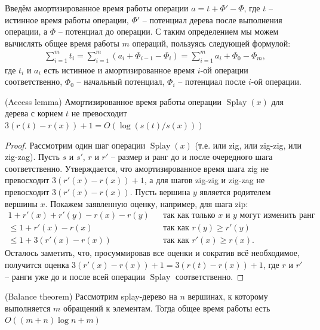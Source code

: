 \documentclass[a4paper,11pt]{article}
\DeclareMathOperator{\splay}{Splay}
\begin{document}
Введём амортизированное время работы операции \(a = t + \Phi' -\Phi\), где \(t\) -- истинное время работы операции, \(\Phi'\) -- потенциал дерева после выполнения операции, а \(\Phi\) -- потенциал до операции. С таким определением мы можем вычислять общее время работы \(m\) операций, пользуясь следующей формулой:
\begin{align}\label{eq:1}
    \sum_{i=1}^m{t_i} = \sum_{i=1}^m{(a_i + \Phi_{i-1} - \Phi_{i})} = \sum_{i=1}^m{a_i} + \Phi_0 - \Phi_{m},
\end{align}
где \(t_i\) и \(a_i\) есть истинное и амортизированное время \(i\)-ой операции соответственно, \(\Phi_0\) -- начальный потенциал, \(\Phi_i\) -- потенциал после \(i\)-ой операции.


\begin{lemma}(Access lemma)
    Амортизированное время работы операции \(\splay(x)\) для дерева с корнем \(t\) не превосходит \(3(r(t) - r(x)) + 1 = O(\log{(s(t)/s(x))})\)
\end{lemma}

\begin{proof}
    Рассмотрим один шаг операции \(\splay{(x)}\) (т.е. или zig, или zig-zig, или zig-zag). Пусть \(s\) и \(s'\), \(r\) и \(r'\) -- размер и ранг до и после очередного шага соответственно. Утверждается, что амортизированное время шага zig не превосходит \(3(r'(x)-r(x)) + 1\), а для шагов zig-zig и zig-zag не превосходит \(3(r'(x)-r(x))\). Пусть вершина \(y\) является родителем вершины \(x\). Покажем заявленную оценку, например, для шага zip:
    \begin{align*}
        1 + r'(x) + r'(y) - r(x) - r(y) 
        & &\text{так как только }x \text{ и } y \text{ могут изменить ранг} \\
        \leq 1 + r'(x) - r(x) & &\text{так как } r(y) \geq r'(y) \\
        \leq 1 + 3(r'(x) - r(x))  & &\text{так как } r'(x) \geq r(x).
    \end{align*}
    Осталось заметить, что, просуммировав все оценки и сократив всё необходимое, получится оценка \(3(r'(x) - r(x)) + 1 = 3(r(t) - r(x)) + 1\), где \(r\) и \(r'\) -- ранги уже до и после всей операции \(\splay\) соответственно. 
    
\end{proof}

 

\begin{theorem}(Balance theorem)
    Рассмотрим splay-дерево на \(n\) вершинах, к которому выполняется \(m\) обращений к элементам. Тогда общее время работы есть \(O((m+n)\log{n} + m)\)
\end{theorem}
\end{document}
